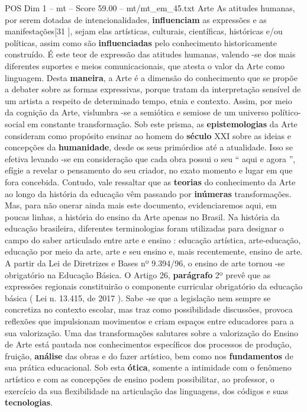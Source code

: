 \begin{textsample}{POS Dim 1 – mt – Score 59.00 – mt/mt\_em\_45.txt}
Arte As atitudes humanas, por serem dotadas de intencionalidades, \textbf{influenciam} as expressões e as manifestações[31 ], sejam elas artísticas, culturais, científicas, históricas e/ou políticas, assim como são \textbf{influenciadas} pelo conhecimento historicamente construído.
É este teor de expressão das atitudes humanas, valendo -se dos mais diferentes suportes e meios comunicacionais, que atesta o valor da Arte como linguagem.
Desta \textbf{maneira}, a Arte é a dimensão do conhecimento que se propõe a debater sobre as formas expressivas, porque tratam da interpretação sensível de um artista a respeito de determinado tempo, etnia e contexto.
Assim, por meio da cognição da Arte, vislumbra -se a semiótica e semiose de um universo político-social em constante transformação.
Sob este prisma, as \textbf{epistemologias} da Arte consideram como propósito ensinar ao homem do \textbf{século} XXI sobre as ideias e concepções da \textbf{humanidade}, desde os seus primórdios até a atualidade.
Isso se efetiva levando -se em consideração que cada obra possui o seu “ aqui e agora ”, efígie a revelar o pensamento do seu criador, no exato momento e lugar em que fora concebida.
Contudo, vale ressaltar que as \textbf{teorias} do conhecimento da Arte ao longo da história da educação vêm passando por \textbf{inúmeras} transformações.
Mas, para não onerar ainda mais este documento, evidenciaremos aqui, em poucas linhas, a história do ensino da Arte apenas no Brasil.
Na história da educação brasileira, diferentes terminologias foram utilizadas para designar o campo do saber articulado entre arte e ensino : educação artística, arte-educação, educação por meio da arte, arte e seu ensino e, mais recentemente, ensino de arte.
A partir da Lei de Diretrizes e Bases nº 9.394/96, o ensino de arte tornou -se obrigatório na Educação Básica.
O Artigo 26, \textbf{parágrafo} 2º prevê que as expressões regionais constituirão o componente curricular obrigatório da educação básica ( Lei n. 13.415, de 2017 ).
Sabe -se que a legislação nem sempre se concretiza no contexto escolar, mas traz como possibilidade discussões, provoca reflexões que impulsionam movimentos e criam espaços entre educadores para a sua valorização.
Uma das transformações salutares sobre a valorização do Ensino de Arte está pautada nos conhecimentos específicos dos processos de produção, fruição, \textbf{análise} das obras e do fazer artístico, bem como nos \textbf{fundamentos} de sua prática educacional.
Sob esta \textbf{ótica}, somente a intimidade com o fenômeno artístico e com as concepções de ensino podem possibilitar, ao professor, o exercício da sua flexibilidade na articulação das linguagens, dos códigos e suas \textbf{tecnologias}.

\end{textsample}
